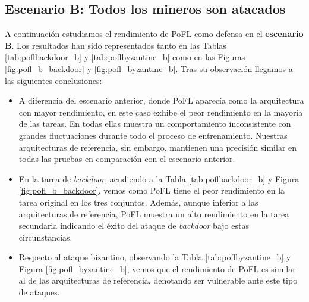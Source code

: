\subsection{Escenario B: Todos los mineros son atacados}\label{sec:pofl_b}
A continuación estudiamos el rendimiento de \ac{PoFL} como defensa en el \textbf{escenario B}. Los resultados han sido representados tanto en las Tablas \ref{tab:poflbackdoor_b} y \ref{tab:poflbyzantine_b} como en las Figuras \ref{fig:pofl_b_backdoor} y \ref{fig:pofl_byzantine_b}. Tras su observación llegamos a las siguientes conclusiones:
\begin{itemize}
	\item A diferencia del escenario anterior, donde \ac{PoFL} aparecía como la arquitectura con mayor rendimiento, en este caso exhibe el peor rendimiento en la mayoría de las tareas. En todas ellas muestra un comportamiento inconsistente con grandes fluctuaciones durante todo el proceso de entrenamiento. Nuestras arquitecturas de referencia, sin embargo, mantienen una precisión similar en todas las pruebas en comparación con el escenario anterior.
	
	\item En la tarea de \textit{backdoor}, acudiendo a la Tabla \ref{tab:poflbackdoor_b} y Figura \ref{fig:pofl_b_backdoor}, vemos como \ac{PoFL} tiene el peor rendimiento en la tarea original en los tres conjuntos. Además, aunque inferior a las arquitecturas de referencia, \ac{PoFL} muestra un alto rendimiento en la tarea secundaria indicando el éxito del ataque de \textit{backdoor} bajo estas circunstancias.
	
	\item Respecto al ataque bizantino, observando la Tabla \ref{tab:poflbyzantine_b} y Figura \ref{fig:pofl_byzantine_b}, vemos que el rendimiento de \ac{PoFL} es similar al de las arquitecturas de referencia, denotando ser vulnerable ante este tipo de ataques.
\end{itemize}


